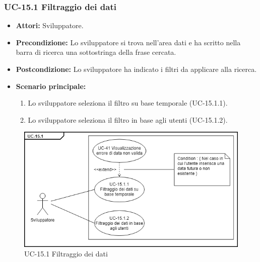 	\subsubsection{UC-15.1 Filtraggio dei dati}	
		\begin{itemize}
			\item \textbf{Attori:} Sviluppatore.
			\item \textbf{Precondizione:} Lo sviluppatore si trova nell'area dati e ha scritto nella barra di ricerca una sottostringa della frase cercata.
			\item \textbf{Postcondizione:} Lo sviluppatore ha indicato i filtri da applicare alla ricerca.
			\item \textbf{Scenario principale:}
				\begin{enumerate}
					\item Lo sviluppatore seleziona il filtro su base temporale (UC-15.1.1).
					\item Lo sviluppatore seleziona il filtro in base agli utenti (UC-15.1.2).
				\end{enumerate}
			\end{itemize}
	\begin{figure}[h]
			\centering
			\includegraphics[scale=0.7]{images/UC-15_1.png}
			\caption{UC-15.1 Filtraggio dei dati}
		\end{figure}	
	
